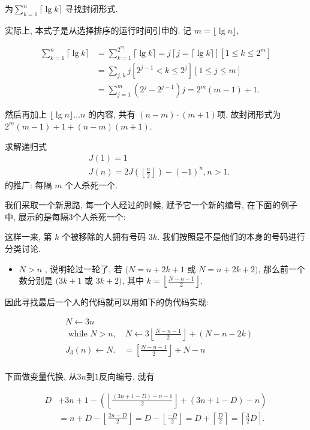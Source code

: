 \documentclass{ctexart}
\begin{document}
\begin{example}
为$\sum_{k=1}^n\lceil\lg k\rceil$ 寻找封闭形式. 

实际上, 本式子是从选择排序的运行时间引申的. 记 $m=\lfloor\lg n\rfloor$, 

$$\begin{aligned} \sum_{k=1}^n\lceil\lg k\rceil & =\sum_{k=1}^{2^m}\lceil\lg k\rceil=j[j=\lceil\lg k\rceil]\left[1 \leqslant k \leqslant 2^m\right] \\ & =\sum_{j, k} j\left[2^{j-1}<k \leqslant 2^j\right][1 \leqslant j \leqslant m] \\ & =\sum_{j=1}^m\left(2^j-2^{j-1}\right) j=2^m(m-1)+1 .\end{aligned}$$

然后再加上 $\lfloor\lg n\rfloor \ldots n$ 的内容, 共有 $(n-m) \cdot(m+1)$项. 故封闭形式为$2^m(m-1)+1+(n-m)(m+1)$.

\end{example}

\begin{example}[Josephus问题]
    求解递归式
    $$
\begin{aligned}
& J(1)=1 \\
& J(n)=2 J\left(\left\lfloor\frac{n}{2}\right\rfloor\right)-(-1)^n, n>1 .
\end{aligned}
$$
的推广: 每隔 $m$ 个人杀死一个. 

我们采取一个新思路, 每一个人经过的时候, 赋予它一个新的编号, 在下面的例子中, 展示的是每隔3个人杀死一个: 


这样一来, 第 $k$ 个被移除的人拥有号码 $3 k$. 我们按照是不是他们的本身的号码进行分类讨论. 

\begin{itemize}
    \item $N>n$ , 说明轮过一轮了, 若 $(N=n+2 k+1$ 或 $N=n+2 k+2)$, 那么前一个数分别是 $(3 k+1$ 或 $3 k+2)$, 其中 $k=\left\lfloor\frac{N-n-1}{2}\right\rfloor$. 
\end{itemize}

因此寻找最后一个人的代码就可以用如下的伪代码实现: 

$$
\begin{aligned}
& N \leftarrow 3 n \\
& \text { while } N>n, \quad N \leftarrow 3\left\lfloor\frac{N-n-1}{2}\right\rfloor+(N-n-2 k) \\
& J_3(n) \leftarrow N . \quad=\left[\frac{N-n-1}{2}\right\rfloor+N-n \\
&
\end{aligned}
$$

下面做变量代换, 从$3n$到$1$反向编号, 就有

$$
\begin{aligned}
D & +3 n+1-\left(\left\lfloor\frac{(3 n+1-D)-n-1}{2}\right\rfloor+(3 n+1-D)-n\right) \\
& =n+D-\left\lfloor\frac{2 n-D}{2}\right\rfloor=D-\left\lfloor\frac{-D}{2}\right\rfloor=D+\left\lceil\frac{D}{2}\right\rceil=\left\lceil\frac{3}{2} D\right\rceil .
\end{aligned}
$$
    
\end{example}
\end{document}
